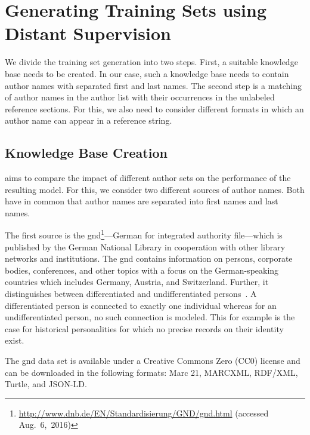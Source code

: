 \section{Generating Training Sets using Distant Supervision}\label{sec:i-distant-supervision}

We divide the training set generation into two steps.
First, a suitable knowledge base needs to be created.
In our case, such a knowledge base needs to contain author names with separated first and last names.
The second step is a matching of author names in the author list with their occurrences in the unlabeled reference sections.
For this, we also need to consider different formats in which an author name can appear in a reference string.

\subsection{Knowledge Base Creation}\label{subsec:i-knowledge-base-creation}

 aims to compare the impact of different author sets on the performance of the resulting model.
For this, we consider two different sources of author names.
Both have in common that author names are separated into first names and last names.

\bigskip

The first source is the \acrfull{gnd}\footnote{\url{http://www.dnb.de/EN/Standardisierung/GND/gnd.html} (accessed Aug.~6,~2016)}---German for integrated authority file---which is published by the German National Library in cooperation with other library networks and institutions.
The \gls{gnd} contains information on persons, corporate bodies, conferences, and other topics with a focus on the German-speaking countries which includes Germany, Austria, and Switzerland.
Further, it distinguishes between differentiated and undifferentiated persons~\citep{hochstein2013ihr}.
A differentiated person is connected to exactly one individual whereas for an undifferentiated person, no such connection is modeled.
This for example is the case for historical personalities for which no precise records on their identity exist.

The \gls{gnd} data set is available under a Creative Commons Zero (CC0) license and can be downloaded in the following formats: Marc 21, MARCXML, RDF/XML, Turtle, and JSON-LD.\@

